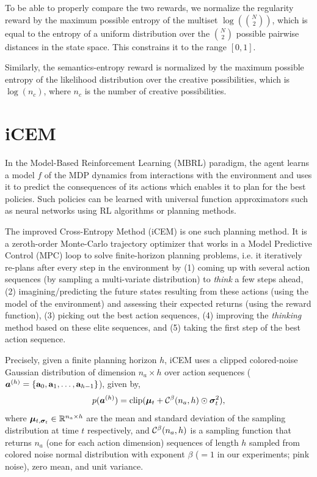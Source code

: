 To be able to properly compare the two rewards, we normalize the regularity reward by the maximum possible entropy of the multiset \(\log\left(\binom{N}{2}\right)\), which is equal to the entropy of a uniform distribution over the \(\binom{N}{2}\) possible pairwise distances in the state space.
This constrains it to the range \([0, 1]\).

Similarly, the semantics-entropy reward is normalized by the maximum possible entropy of the likelihood distribution over the creative possibilities, which is \(\log(n_c)\), where \(n_c\) is the number of creative possibilities.

\section{iCEM}
\label{sec:icem}

In the Model-Based Reinforcement Learning (MBRL) paradigm, the agent learns a model \(f\) of the MDP dynamics from interactions with the environment and uses it to predict the consequences of its actions which enables it to plan for the best policies.
Such policies can be learned with universal function approximators such as neural networks using RL algorithms or planning methods.

The improved Cross-Entropy Method (iCEM) is one such planning method.
It is a zeroth-order Monte-Carlo trajectory optimizer that works in a Model Predictive Control (MPC) loop to solve finite-horizon planning problems, i.e. it iteratively re-plans after every step in the environment by (1) coming up with several action sequences (by sampling a multi-variate distribution) to \emph{think} a few steps ahead, (2) imagining/predicting the future states resulting from these actions (using the model of the environment) and assessing their expected returns (using the reward function), (3) picking out the best action sequences, (4) improving the \emph{thinking} method based on these elite sequences, and (5) taking the first step of the best action sequence.

Precisely, given a finite planning horizon \(h\), iCEM uses a clipped colored-noise Gaussian distribution of dimension \(n_a \times h\) over action sequences (\(\bm{a}^{(h)} = \{ \mathbf{a}_0, \mathbf{a}_1, \ldots, \mathbf{a}_{h-1} \}\)), given by,
\begin{equation}
    \label{eq:icem-distribution}
    p(\bm{a}^{(h)}) = \text{clip}(\bm{\mu}_t + \mathcal{C}^\beta(n_a, h) \odot \bm{\sigma}_t^2),
\end{equation}
where \(\bm{\mu}_{t, \bm{\sigma}_{t}} \in \mathbb{R}^{n_a \times h}\) are the mean and standard deviation of the sampling distribution at time \(t\) respectively, and \(\mathcal{C}^\beta(n_a, h)\) is a sampling function that returns \(n_a\) (one for each action dimension) sequences of length \(h\) sampled from colored noise normal distribution with exponent \(\beta\) (\(= 1\) in our experiments; pink noise), zero mean, and unit variance.


